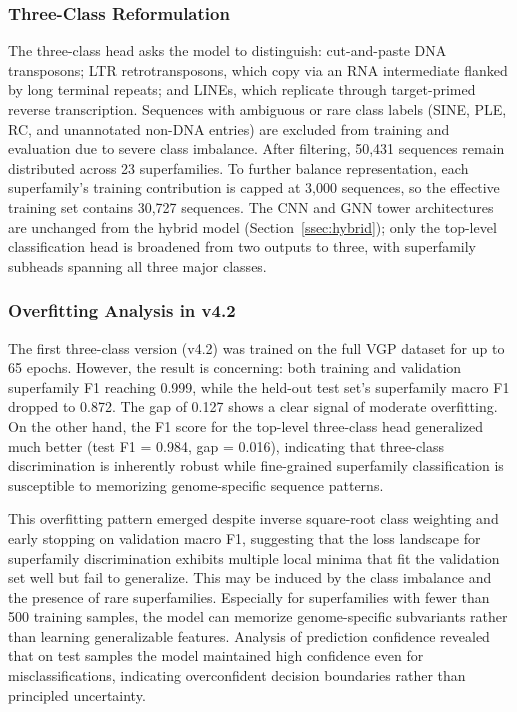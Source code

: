 \documentclass[12pt]{article}
\begin{document}
\subsubsection{Three-Class Reformulation}

The three-class head asks the model to distinguish: cut-and-paste DNA transposons; LTR retrotransposons, which copy via an RNA intermediate flanked by long terminal repeats; and LINEs, which replicate through target-primed reverse transcription. Sequences with ambiguous or rare class labels (SINE, PLE, RC, and unannotated non-DNA entries) are excluded from training and evaluation due to severe class imbalance. After filtering, 50,431 sequences remain distributed across 23 superfamilies. To further balance representation, each superfamily's training contribution is capped at 3,000 sequences, so the effective training set contains 30,727 sequences. The CNN and GNN tower architectures are unchanged from the hybrid model (Section~\ref{ssec:hybrid}); only the top-level classification head is broadened from two outputs to three, with superfamily subheads spanning all three major classes.

\subsubsection{Overfitting Analysis in v4.2}

The first three-class version (v4.2) was trained on the full VGP dataset for up to 65 epochs. However, the result is concerning: both training and validation superfamily F1 reaching 0.999, while the held-out test set's superfamily macro F1 dropped to 0.872. The gap of 0.127 shows a clear signal of moderate overfitting. On the other hand, the F1 score for the top-level three-class head generalized much better (test F1 = 0.984, gap = 0.016), indicating that three-class discrimination is inherently robust while fine-grained superfamily classification is susceptible to memorizing genome-specific sequence patterns. 

This overfitting pattern emerged despite inverse square-root class weighting and early stopping on validation macro F1, suggesting that the loss landscape for superfamily discrimination exhibits multiple local minima that fit the validation set well but fail to generalize. This may be induced by the class imbalance and the presence of rare superfamilies. Especially for superfamilies with fewer than 500 training samples, the model can memorize genome-specific subvariants rather than learning generalizable features. Analysis of prediction confidence revealed that on test samples the model maintained high confidence even for misclassifications, indicating overconfident decision boundaries rather than principled uncertainty. 
\end{document}
